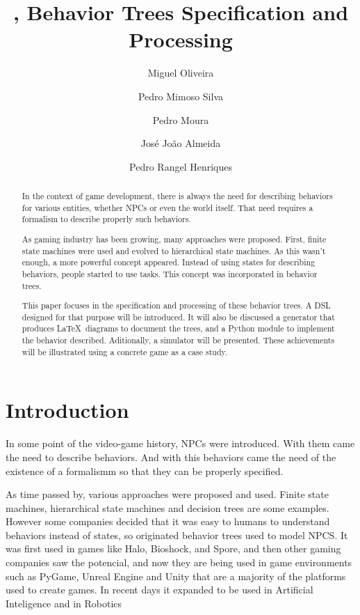 \documentclass[a4paper,UKenglish,cleveref, autoref, thm-restate]{oasics-v2019}
\title{\bht, Behavior Trees Specification and Processing} %
\author{Miguel Oliveira}{Centro ALGORITMI, DI, Universidade do Minho, Portugal}{}{}{}
\author{Pedro Mimoso Silva}{Centro ALGORITMI, DI, Universidade do Minho, Portugal}{}{}{}
\author{Pedro Moura}{Centro ALGORITMI, DI, Universidade do Minho, Portugal}{}{}{}
\author{José João Almeida}{Centro ALGORITMI, DI, Universidade do Minho, Portugal}{}{}{}
\author{Pedro Rangel Henriques}{Centro ALGORITMI, DI, Universidade do Minho, Portugal}{}{}{}
\begin{document}
\maketitle

\begin{abstract}
In the context of game development, there is always the need for describing behaviors for various entities, whether NPCs or even the world itself.
That need requires a formalism to describe properly such behaviors.

As gaming industry has been growing, many approaches were proposed.
First, finite state machines were used and evolved to hierarchical state machines.
As this wasn't enough, a more powerful concept appeared.
Instead of using states for describing behaviors, people started to use tasks.
This concept was incorporated in behavior trees.

This paper focuses in the specification and processing of these behavior trees.
A DSL designed for that purpose will be introduced.
It will also be discussed a generator that produces \LaTeX\ diagrams to document the trees, and a Python module to implement the behavior described.
Aditionally, a simulator will be presented. 
These achievements will be illustrated using a concrete game as a case study.
\end{abstract}


\section{Introduction}
\label{sec:introduction}

In some point of the video-game history, NPCs were introduced. 
With them came the need to describe behaviors.
And with this behaviors came the need of the existence of a formalismm so that they can be properly specified.


As time passed by, various approaches were proposed and used. Finite state machines, hierarchical state machines and decision trees are some examples. 
However some companies decided that it was easy to humans to understand behaviors instead of states, so originated behavior trees used to model NPCS.
It was first used in games like Halo, Bioshock, and Spore, and then other gaming companies saw the potencial, and now they are being used in game environments such as PyGame, Unreal Engine and Unity that are a majority of the platforms used to create games.
In recent days it expanded to be used in Artificial Inteligence and in Robotics
\end{document}
